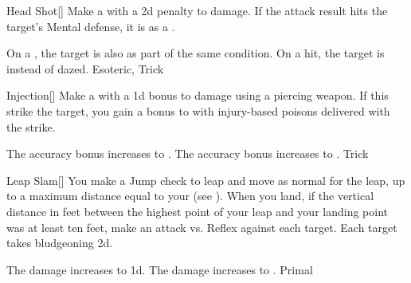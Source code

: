 \lowercase{\hypertarget{maneuver:Head Shot}{}}\label{maneuver:Head Shot}
\hypertarget{maneuver:Head Shot}{}
\begin{freeability}[Rank 3]{Head Shot}[]
Make a  with a \minus2d penalty to damage.
If the attack result hits the target's Mental defense,
it is  as a .

\rankline
{} On a , the target is also  as part of the same condition.
 On a hit, the target is  instead of dazed.
 Esoteric, Trick
\end{freeability}
\vspace{0.25em}



\lowercase{\hypertarget{maneuver:Injection}{}}\label{maneuver:Injection}
\hypertarget{maneuver:Injection}{}
\begin{freeability}[Rank 3]{Injection}[]
Make a  with a \plus1d bonus to damage using a piercing weapon.
If this strike  the target, you gain a  bonus to  with injury-based poisons delivered with the strike.

\rankline
{} The accuracy bonus increases to .
 The accuracy bonus increases to .
 Trick
\end{freeability}
\vspace{0.25em}



\lowercase{\hypertarget{maneuver:Leap Slam}{}}\label{maneuver:Leap Slam}
\hypertarget{maneuver:Leap Slam}{}
\begin{freeability}[Rank 3]{Leap Slam}[]
You make a Jump check to leap and move as normal for the leap, up to a maximum distance equal to your  (see ).
When you land, if the vertical distance in feet between the highest point of your leap and your landing point was at least ten feet, make an attack vs. Reflex against each target.
\hit Each target takes bludgeoning  \minus2d.

\rankline
{} The damage increases to  \minus1d.
 The damage increases to .
 Primal
\end{freeability}
\vspace{0.25em}



